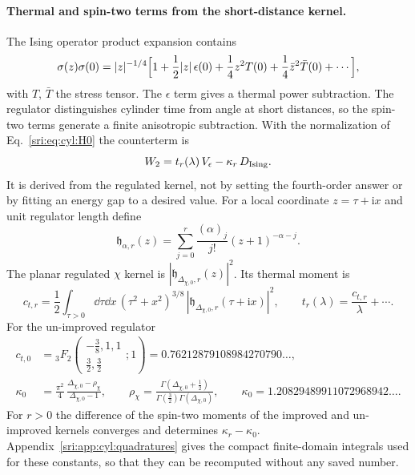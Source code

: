 \paragraph{Thermal and spin-two terms from the short-distance kernel.} The Ising operator product expansion contains
\begin{equation}
 \sigma(z)\sigma(0)=|z|^{-1/4}\Bigl[1+\frac12|z|\,\epsilon(0)+\frac14z^2T(0)+\frac14\bar z^2\bar T(0)+\cdots\Bigr],
\end{equation}
with $T$, $\bar T$ the stress tensor. The $\epsilon$ term gives a thermal power subtraction. The regulator distinguishes
cylinder time from angle at short distances, so the spin-two terms generate a finite anisotropic subtraction. With the
normalization of Eq.~\eqref{sri:eq:cyl:H0} the counterterm is
\begin{equation}
 W_2=t_r(\lambda)\,V_\epsilon-\kappa_r\,D_{\rm Ising}.
 \label{sri:eq:cyl:W2}
\end{equation}
It is derived from the regulated kernel, not by setting the fourth-order answer or by fitting an energy gap to a
desired value. For a local coordinate $z=\tau+\mathrm ix$ and unit regulator length define
\begin{equation}
 \mathfrak h_{\alpha,r}(z)=\sum_{j=0}^r\frac{(\alpha)_j}{j!}(z+1)^{-\alpha-j}.
\end{equation}
The planar regulated $\chi$ kernel is $|\mathfrak h_{\Delta_{\chi,0},r}(z)|^2$. Its thermal moment is
\begin{equation}
 c_{t,r}=\frac12\int_{\tau>0}\dd\tau\dd x\,(\tau^2+x^2)^{3/8}\,|\mathfrak h_{\Delta_{\chi,0},r}(\tau+\mathrm ix)|^2,
 \qquad t_r(\lambda)=\frac{c_{t,r}}{\lambda}+\cdots.
\end{equation}
For the un-improved regulator
\begin{equation}
\begin{aligned}
 c_{t,0}&={}_3F_2\!\left(\begin{matrix}-\frac38,1,1\\[1pt]\frac32,\frac32\end{matrix};1\right)=0.76212879108984270790\ldots,\\
 \kappa_0&=\frac{\pi^2}{4}\,\frac{\Delta_{\chi,0}-\rho_\chi}{\Delta_{\chi,0}-1},\qquad
 \rho_\chi=\frac{\Gamma(\Delta_{\chi,0}+\frac12)}{\Gamma(\frac32)\Gamma(\Delta_{\chi,0})},\qquad
 \kappa_0=1.20829489911072968942\ldots.
\end{aligned}
\end{equation}
For $r>0$ the difference of the spin-two moments of the improved and un-improved kernels converges and determines
$\kappa_r-\kappa_0$. Appendix~\ref{sri:app:cyl:quadratures} gives the compact finite-domain integrals used for these
constants, so that they can be recomputed without any saved number.


